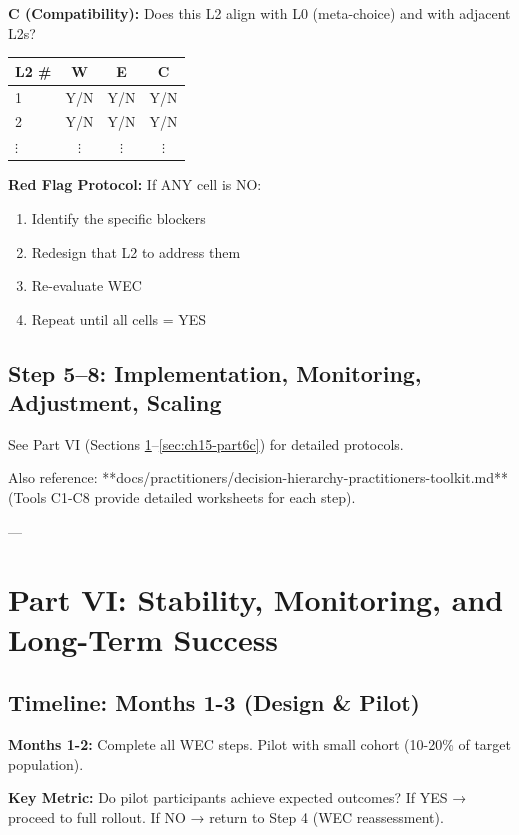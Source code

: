 \documentclass[11pt, a4paper]{article}
\begin{document}
\textbf{C (Compatibility):} Does this L2 align with L0 (meta-choice) and with adjacent L2s?

\begin{center}
\begin{tabular}{|l|c|c|c|}
\hline
\textbf{L2 \#} & \textbf{W} & \textbf{E} & \textbf{C} \\
\hline
1 & Y/N & Y/N & Y/N \\
\hline
2 & Y/N & Y/N & Y/N \\
\hline
$\vdots$ & $\vdots$ & $\vdots$ & $\vdots$ \\
\hline
\end{tabular}
\end{center}

\textbf{Red Flag Protocol:} If ANY cell is NO:
\begin{enumerate}
    \item Identify the specific blockers
    \item Redesign that L2 to address them
    \item Re-evaluate WEC
    \item Repeat until all cells = YES
\end{enumerate}

\subsection{Step 5--8: Implementation, Monitoring, Adjustment, Scaling}

See Part VI (Sections \ref{sec:ch15-part6a}--\ref{sec:ch15-part6c}) for detailed protocols.

Also reference: **docs/practitioners/decision-hierarchy-practitioners-toolkit.md** (Tools C1-C8 provide detailed worksheets for each step).

---

\section{Part VI: Stability, Monitoring, and Long-Term Success} \label{sec:ch15-part6a}

\subsection{Timeline: Months 1-3 (Design \& Pilot)} \label{sec:ch15-part6b}

\textbf{Months 1-2:} Complete all WEC steps. Pilot with small cohort (10-20\% of target population).

\textbf{Key Metric:} Do pilot participants achieve expected outcomes? If YES → proceed to full rollout. If NO → return to Step 4 (WEC reassessment).
\end{document}

